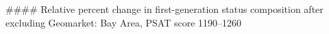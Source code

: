 #### Relative percent change in first-generation status composition after excluding Geomarket: Bay Area, PSAT score 1190–1260
